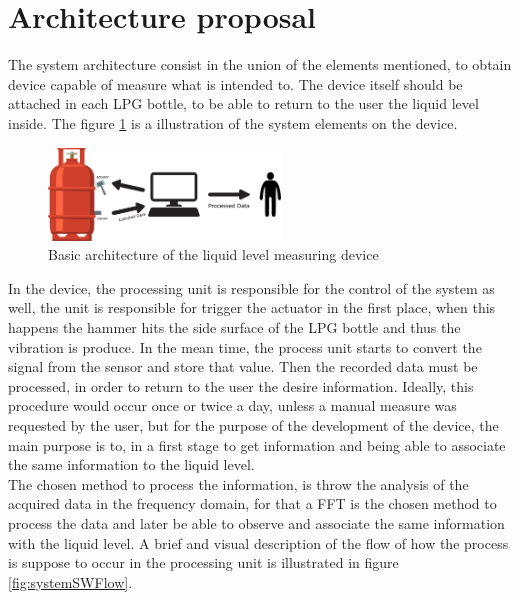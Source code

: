 \section{Architecture proposal}
The system architecture consist in the union of the elements mentioned, to obtain device capable of measure what is intended to. The device itself should be attached in each LPG bottle, to be able to return to the user the liquid level inside. The figure \ref{fig:systemArch} is a illustration of the system elements on the device.\\
\begin{figure}[!htb]
    \centering
    \includegraphics[width=0.55\textwidth]{Chapters/3CHP/Images/bottleBaseAct.eps}
    \caption{Basic architecture of the liquid level measuring device}
    \label{fig:systemArch}
\end{figure}
In the device, the processing unit is responsible for the control of the system as well, the unit is responsible for trigger the actuator in the first place, when this happens the hammer hits the side surface of the LPG bottle and thus the vibration is produce. In the mean time, the process unit starts to convert the signal from the sensor and store that value. Then the recorded data must be processed, in order to return to the user the desire information. Ideally, this procedure would occur once or twice a day, unless a manual measure was requested by the user, but for the purpose of the development of the device, the main purpose is to, in a first stage to get information and being able to associate the same information to the liquid level.\\
The chosen method to process the information, is throw the analysis of the acquired data in the frequency domain, for that a FFT is the chosen method to process the data and later be able to observe and associate the same information with the liquid level. A brief and visual description of the flow of how the process is suppose to occur in the processing unit is illustrated in figure \ref{fig:systemSWFlow}. 
